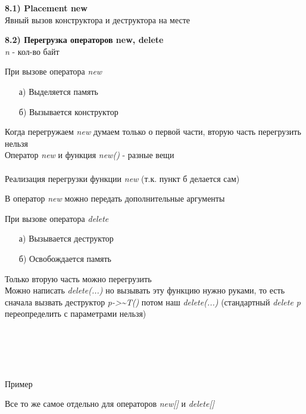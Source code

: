 \documentclass{article}
\begin{document}
\noindent \textbf{8.1) Placement new} \\
Явный вызов конструктора и деструктора на месте

\noindent \textbf{8.2) Перегрузка операторов new, delete}\\
\textit{n} - кол-во байт

При вызове оператора \textit{new}
\begin{itemize}
	\item[а)]Выделяется память
	\item[б)]Вызывается конструктор
\end{itemize}
Когда перегружаем \textit{new} думаем только о первой части, вторую часть перегрузить нельзя\\
Оператор \textit{new} и функция \textit{new()} - разные вещи\\\\
Реализация перегрузки функции \textit{new} (т.к. пункт б делается сам)

В оператор \textit{new} можно передать дополнительные аргументы
 
При вызове оператора \textit{delete}
\begin{itemize}
	\item[а)]Вызывается деструктор
	\item[б)]Освобождается память
\end{itemize}
Только вторую часть можно перегрузить\\
Можно написать \textit{delete(...)} но вызывать эту функцию нужно руками, то есть сначала вызвать деструктор \textit{p->\textasciitilde T()} потом наш \textit{delete(...)}
(стандартный \textit{delete p} переопределить с параметрами нельзя)\\\\\\\\\\\\
Пример

Все то же самое отдельно для операторов \textit{new[]} и \textit{delete[]}\\\\
\end{document}
